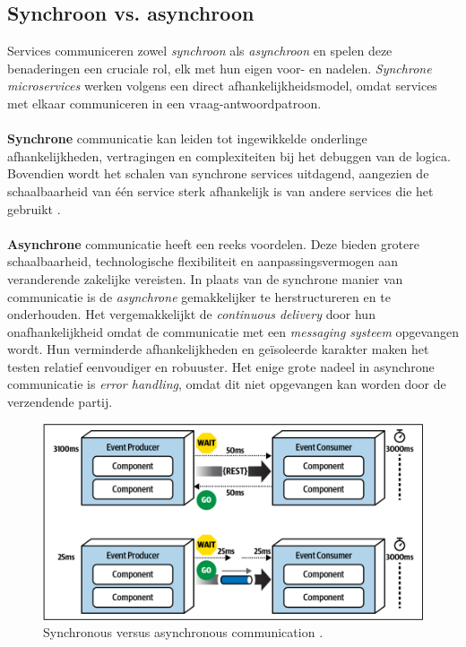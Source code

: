 \subsection{Synchroon vs. asynchroon}
Services communiceren zowel \emph{synchroon} als \emph{asynchroon} en spelen deze benaderingen een cruciale rol, 
elk met hun eigen voor- en nadelen. \emph{Synchrone microservices} werken volgens een direct 
afhankelijkheidsmodel, omdat services met elkaar communiceren in een vraag-antwoordpatroon. 
\\\\
\textbf{Synchrone} communicatie kan leiden tot ingewikkelde onderlinge afhankelijkheden, vertragingen en complexiteiten bij het debuggen 
van de logica. Bovendien wordt het schalen van synchrone services uitdagend, 
aangezien de schaalbaarheid van één service sterk afhankelijk is van andere services die het gebruikt \autocite{Bellemare2020}.  
\\\\
\textbf{Asynchrone} communicatie heeft een reeks voordelen. Deze bieden grotere schaalbaarheid, technologische 
flexibiliteit en aanpassingsvermogen aan veranderende zakelijke vereisten. 
In plaats van de synchrone manier van communicatie is de \emph{asynchrone} gemakkelijker te herstructureren en te onderhouden. 
Het vergemakkelijkt de \emph{continuous delivery} door hun onafhankelijkheid omdat de communicatie 
met een \emph{messaging systeem} opgevangen wordt. 
Hun verminderde afhankelijkheden en geïsoleerde karakter maken het testen relatief eenvoudiger en robuuster.
Het enige grote nadeel in asynchrone communicatie is \emph{error handling}, 
omdat dit niet opgevangen kan worden door de verzendende partij.
\newline

\begin{figure}[h!]
  \centering
  \includegraphics[width=.5\textwidth]{../voorstel/img/synchronous_vs_async_calls.png}
  \caption{\label{fig:sync-vs-async}Synchronous versus asynchronous communication \autocite[figure 14 -- 13]{MarkRichards2021}.}
\end{figure}

